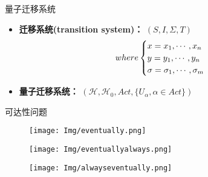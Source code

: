 \documentclass[aspectratio=1610]{ctexbeamer}
\begin{document}
\begin{frame}{量子迁移系统}
    \begin{itemize}
        \item  \textbf{迁移系统(transition system)：} $(S, I, \Sigma, T)$
        \begin{equation}
          where
          \begin{cases}
            x = x_1, \cdots, x_n\\
            y = y_1, \cdots, y_n\\
            \sigma = \sigma_1, \cdots, \sigma_m
          \end{cases}
          \notag
        \end{equation}
        \item \textbf{量子迁移系统：} $(\mathcal{H}, \mathcal{H}_0, Act, \{U_\alpha,\alpha\in Act\})$
    \end{itemize}
\end{frame}
\begin{frame}{可达性问题}
    \begin{figure}
        \texttt{[image: Img/eventually.png]}
    \end{figure}
    \begin{figure}
        \texttt{[image: Img/eventuallyalways.png]}
    \end{figure}
    \begin{figure}
        \texttt{[image: Img/alwayseventually.png]}
    \end{figure}
  \end{frame}
\end{document}
